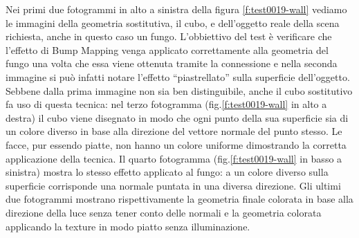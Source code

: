 Nei primi due fotogrammi in alto a sinistra della figura \ref{f:test0019-wall} vediamo le immagini della geometria sostitutiva, il cubo, e dell'oggetto reale della scena richiesta, anche in questo caso un fungo. L'obbiettivo del test \`e verificare che l'effetto di Bump Mapping venga applicato correttamente alla geometria del fungo una volta che essa viene ottenuta tramite la connessione e nella seconda immagine si pu\`o infatti notare l'effetto ``piastrellato'' sulla superficie dell'oggetto. Sebbene dalla prima immagine non sia ben distinguibile, anche il cubo sostitutivo fa uso di questa tecnica: nel terzo fotogramma (fig.\ref{f:test0019-wall} in alto a destra) il cubo viene disegnato in modo che ogni punto della sua superficie sia di un colore diverso in base alla direzione del vettore normale del punto stesso. Le facce, pur essendo piatte, non hanno un colore uniforme dimostrando la corretta applicazione della tecnica. Il quarto fotogramma (fig.\ref{f:test0019-wall} in basso a sinistra) mostra lo stesso effetto applicato al fungo: a un colore diverso sulla superficie corrisponde una normale puntata in una diversa direzione. Gli ultimi due fotogrammi mostrano rispettivamente la geometria finale colorata in base alla direzione della luce senza tener conto delle normali e la geometria colorata applicando la texture in modo piatto senza illuminazione.

